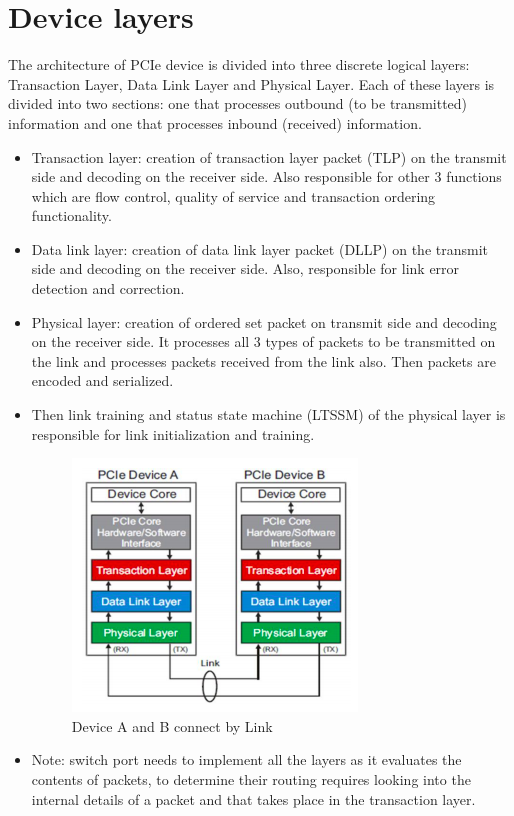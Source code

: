 \section{Device layers}
The architecture of PCIe device is divided into three discrete logical layers: Transaction
Layer, Data Link Layer and Physical Layer. Each of these layers is divided into two
sections: one that processes outbound (to be transmitted) information and one that
processes inbound (received) information.
\begin{itemize}
    \item Transaction layer: creation of transaction layer packet (TLP) on the transmit side
and decoding on the receiver side. Also responsible for other 3 functions which
are flow control, quality of service and transaction ordering functionality.
    \item Data link layer: creation of data link layer packet (DLLP) on the transmit side and
decoding on the receiver side. Also, responsible for link error detection and
correction.
    \item Physical layer: creation of ordered set packet on transmit side and decoding on
the receiver side. It processes all 3 types of packets to be transmitted on the link
and processes packets received from the link also. Then packets are encoded and
serialized.
    \item Then link training and status state machine (LTSSM) of the physical layer is
responsible for link initialization and training.

\begin{figure}[H]
  \centering
  \includegraphics{images/D2.png}
  \caption{Device A and B connect by Link}
  \label{lane}
\end{figure}
    \item Note: switch port needs to implement all the layers as it
evaluates the contents of packets, to determine their
routing requires looking into the internal details of a packet
and that takes place in the transaction layer.


\end{itemize}
